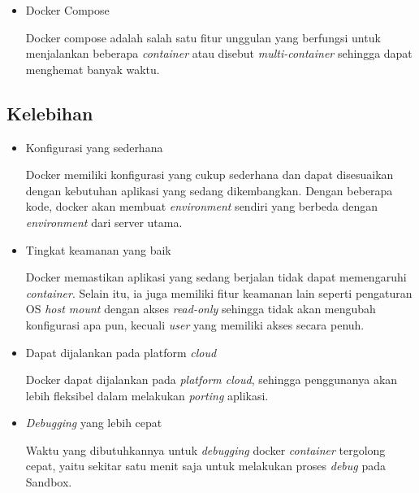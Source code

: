 {{\begin{itemize}
  Docker hub adalah \textit{registry} yang berisikan kumpulan dari berbagai \textit{image} yang disimpan di \textit{data center} milik docker.
  Dengan menggunakan docker hub ini memungkinkan pengguna untuk dapat mengumpulkan dan mendapatkan \textit{image}.  

  \item Docker Compose
  
  Docker compose adalah salah satu fitur unggulan yang berfungsi untuk menjalankan beberapa \textit{container} atau disebut \textit{multi-container} sehingga dapat menghemat banyak waktu.

\end{itemize}

\subsection{Kelebihan}
\begin{itemize}
  \item Konfigurasi yang sederhana
  
  Docker memiliki konfigurasi yang cukup sederhana dan dapat disesuaikan dengan kebutuhan aplikasi yang sedang dikembangkan.
  Dengan beberapa kode, docker akan membuat \textit{environment} sendiri yang berbeda dengan \textit{environment} dari server utama.

  \item Tingkat keamanan yang baik
  
  Docker memastikan aplikasi yang sedang berjalan tidak dapat memengaruhi \textit{container}.
  Selain itu, ia juga memiliki fitur keamanan lain seperti pengaturan OS \textit{host mount} dengan akses \textit{read-only} sehingga tidak akan mengubah konfigurasi apa pun, kecuali \textit{user} yang memiliki akses secara penuh.

  \item Dapat dijalankan pada platform \textit{cloud}
  
  Docker dapat dijalankan pada \textit{platform cloud}, sehingga penggunanya akan lebih fleksibel dalam melakukan \textit{porting} aplikasi.

  \item \textit{Debugging} yang lebih cepat
  
  Waktu yang dibutuhkannya untuk \textit{debugging} docker \textit{container} tergolong cepat, yaitu sekitar satu menit saja untuk melakukan proses \textit{debug} pada Sandbox.

\end{itemize}

}}
